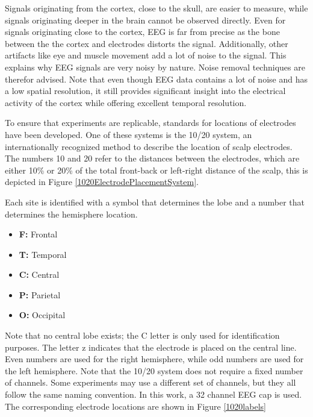 
Signals originating from the cortex, close to the skull, are easier to measure, while signals originating deeper in the brain cannot be observed directly. Even for signals originating close to the cortex, EEG is far from precise as the bone between the the cortex and electrodes distorts the signal. Additionally, other artifacts like eye and muscle movement add a lot of noise to the signal. This explains why EEG signals are very noisy by nature. Noise removal techniques are therefor advised\citep{noiseRem}. Note that even though EEG data contains a lot of noise and has a low spatial resolution, it still provides significant insight into the electrical activity of the cortex while offering excellent temporal resolution\cite{GivenPaper}.

\npar

To ensure that experiments are replicable, standards for locations of electrodes have been developed. One of these systems is the 10/20 system, an internationally recognized method to describe the location of scalp electrodes\cite{TenTwentyManual}. The numbers 10 and 20 refer to the distances between the electrodes, which are either 10\% or 20\% of the total front-back or left-right distance of the scalp, this is depicted in Figure \ref{1020ElectrodePlacementSystem}. 


Each site is identified with a symbol that determines the lobe and a number that determines the hemisphere location.
\begin{itemize}
\item \textbf{F:} Frontal
\item \textbf{T:} Temporal
\item \textbf{C:} Central
\item \textbf{P:} Parietal
\item \textbf{O:} Occipital
\end{itemize}
Note that no central lobe exists; the C letter is only used for identification purposes. The letter z indicates that the electrode is placed on the central line. Even numbers are used for the right hemisphere, while odd numbers are used for the left hemisphere. Note that the 10/20 system does not require a fixed number of channels. Some experiments may use a different set of channels, but they all follow the same naming convention. In this work, a 32 channel EEG cap is used. The corresponding electrode locations are shown in Figure \ref{1020labels}

